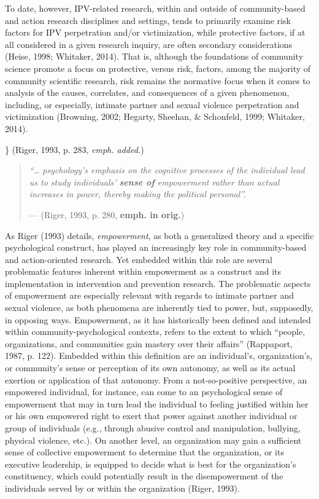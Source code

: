 \documentclass[11pt,]{tufte-book}
\begin{document}
To date, however, IPV-related research, within and outside of
community-based and action research disciplines and settings, tends to
primarily examine risk factors for IPV perpetration and/or
victimization, while protective factors, if at all considered in a given
research inquiry, are often secondary considerations (Heise, 1998;
Whitaker, 2014). That is, although the foundations of community science
promote a focus on protective, versus risk, factors, among the majority
of community scientific research, risk remains the normative focus when
it comes to analysis of the causes, correlates, and consequences of a
given phenomenon, including, or especially, intimate partner and sexual
violence perpetration and victimization (Browning, 2002; Hegarty,
Sheehan, \& Schonfeld, 1999; Whitaker, 2014).

\}
(Riger, 1993, p. 283, \emph{emph. added.})

\begin{quote}
\emph{``\ldots{} psychology's emphasis on the cognitive processes of the
individual lead us to study individuals' \textbf{sense of} empowerment
rather than actual increases in power, thereby making the political
personal''.}

\hfill --- (Riger, 1993, p. 280, \textbf{emph. in orig.})
\end{quote}

As Riger (1993) details, \emph{empowerment}, as both a generalized
theory and a specific psychological construct, has played an
increasingly key role in community-based and action-oriented research.
Yet embedded within this role are several problematic features inherent
within empowerment as a construct and its implementation in intervention
and prevention research. The problematic aspects of empowerment are
especially relevant with regards to intimate partner and sexual
violence, as both phenomena are inherently tied to power, but,
supposedly, in opposing ways. Empowerment, as it has historically been
defined and intended within community-psychological contexts, refers to
the extent to which ``people, organizations, and communities gain
mastery over their affairs'' (Rappaport, 1987, p. 122). Embedded within
this definition are an individual's, organization's, or community's
sense or perception of its own autonomy, as well as its actual exertion
or application of that autonomy. From a not-so-positive perspective, an
empowered individual, for instance, can come to an psychological sense
of empowerment that may in turn lead the individual to feeling justified
within her or his own empowered right to exert that power against
another individual or group of individuals (e.g., through abusive
control and manipulation, bullying, physical violence, etc.). On another
level, an organization may gain a sufficient sense of collective
empowerment to determine that the organization, or its executive
leadership, is equipped to decide what is best for the organization's
constituency, which could potentially result in the disempowerment of
the individuals served by or within the organization (Riger, 1993).
\end{document}
